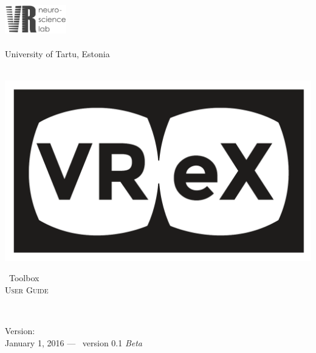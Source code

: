 \begin{titlepage}
\begin{center}

\includegraphics[width=0.2\textwidth]{lablogo}~\\[3cm]

\textsc{\LARGE \vrexlab}\\[0.4cm]
{\Large University of Tartu, Estonia}\\[1.5cm]

\HRule \\[0.4cm]

\begin{center}
\begin{minipage}[c]{\textwidth}
\begin{flushleft}
\begin{minipage}{0.3\textwidth}
\includegraphics[width=\linewidth]{vrex_logo}
\end{minipage}
\begin{minipage}{0.4\textwidth}
\centering
{ \Huge \vrexx\ Toolbox\\[0.4cm] }
\textsc{\Large User Guide}\\[0.5cm]
\end{minipage}
\end{flushleft}
\end{minipage}
\end{center}

\HRule \\[1.5cm]

\vfill

\begin{flushright}
\large Version:\\
\normalsize
January 1, 2016 --- \vrexx\ version 0.1 \textit{Beta} 				%
\end{flushright}

\end{center}

\end{titlepage}